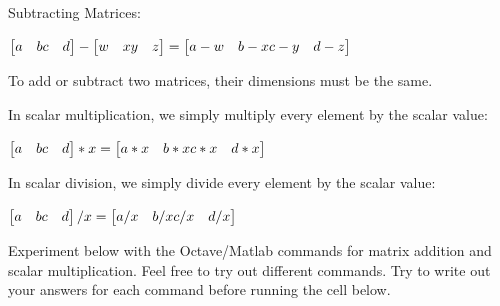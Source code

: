 \documentclass[
]{book}
\begin{document}
Subtracting Matrices:

\(\begin{bmatrix} a & b \newline c & d \newline \end{bmatrix} - \begin{bmatrix} w & x \newline y & z \newline \end{bmatrix} =\begin{bmatrix} a-w & b-x \newline c-y & d-z \newline \end{bmatrix}\)

To add or subtract two matrices, their dimensions must be the same.

In scalar multiplication, we simply multiply every element by the scalar value:

\(\begin{bmatrix} a & b \newline c & d \newline \end{bmatrix} * x =\begin{bmatrix} a*x & b*x \newline c*x & d*x \newline \end{bmatrix}\)

In scalar division, we simply divide every element by the scalar value:

\(\begin{bmatrix} a & b \newline c & d \newline \end{bmatrix} / x =\begin{bmatrix} a /x & b/x \newline c /x & d /x \newline \end{bmatrix}\)

Experiment below with the Octave/Matlab commands for matrix addition and scalar multiplication. Feel free to try out different commands. Try to write out your answers for each command before running the cell below.
\end{document}
